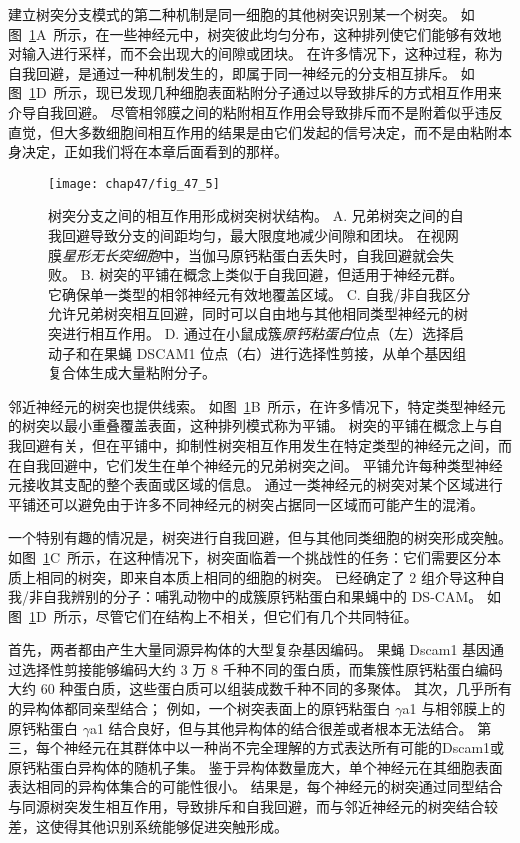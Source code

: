 建立树突分支模式的第二种机制是同一细胞的其他树突识别某一个树突。
如图~\ref{fig:47_5}A~所示，在一些神经元中，树突彼此均匀分布，这种排列使它们能够有效地对输入进行采样，而不会出现大的间隙或团块。
在许多情况下，这种过程，称为自我回避，是通过一种机制发生的，即属于同一神经元的分支相互排斥。
如图~\ref{fig:47_5}D~所示，现已发现几种细胞表面粘附分子通过以导致排斥的方式相互作用来介导自我回避。
尽管相邻膜之间的粘附相互作用会导致排斥而不是附着似乎违反直觉，但大多数细胞间相互作用的结果是由它们发起的信号决定，而不是由粘附本身决定，正如我们将在本章后面看到的那样。


\begin{figure}[htbp]
	\centering
	\texttt{[image: chap47/fig\_47\_5]}
	\caption{树突分支之间的相互作用形成树突树状结构。
		A. 兄弟树突之间的自我回避导致分支的间距均匀，最大限度地减少间隙和团块。
		在视网膜\textit{星形无长突细胞}中，当伽马原钙粘蛋白丢失时，自我回避就会失败。
		B. 树突的平铺在概念上类似于自我回避，但适用于神经元群。
		它确保单一类型的相邻神经元有效地覆盖区域。
		C. 自我/非自我区分允许兄弟树突相互回避，同时可以自由地与其他相同类型神经元的树突进行相互作用。
		D. 通过在小鼠成簇\textit{原钙粘蛋白}位点（左）选择启动子和在果蝇 DSCAM1 位点（右）进行选择性剪接，从单个基因组复合体生成大量粘附分子。}
	\label{fig:47_5}
\end{figure}


邻近神经元的树突也提供线索。
如图~\ref{fig:47_5}B~所示，在许多情况下，特定类型神经元的树突以最小重叠覆盖表面，这种排列模式称为平铺。
树突的平铺在概念上与自我回避有关，但在平铺中，抑制性树突相互作用发生在特定类型的神经元之间，而在自我回避中，它们发生在单个神经元的兄弟树突之间。
平铺允许每种类型神经元接收其支配的整个表面或区域的信息。
通过一类神经元的树突对某个区域进行平铺还可以避免由于许多不同神经元的树突占据同一区域而可能产生的混淆。


一个特别有趣的情况是，树突进行自我回避，但与其他同类细胞的树突形成突触。
如图~\ref{fig:47_5}C~所示，在这种情况下，树突面临着一个挑战性的任务：它们需要区分本质上相同的树突，即来自本质上相同的细胞的树突。
已经确定了 2 组介导这种自我/非自我辨别的分子：哺乳动物中的成簇原钙粘蛋白和果蝇中的 DS-CAM。
如图~\ref{fig:47_5}D~所示，尽管它们在结构上不相关，但它们有几个共同特征。


首先，两者都由产生大量同源异构体的大型复杂基因编码。
果蝇 Dscam1 基因通过选择性剪接能够编码大约 3 万 8 千种不同的蛋白质，而集簇性原钙粘蛋白编码大约 60 种蛋白质，这些蛋白质可以组装成数千种不同的多聚体。
其次，几乎所有的异构体都同亲型结合；
例如，一个树突表面上的原钙粘蛋白 $\gamma$a1 与相邻膜上的原钙粘蛋白 $\gamma$a1 结合良好，但与其他异构体的结合很差或者根本无法结合。
第三，每个神经元在其群体中以一种尚不完全理解的方式表达所有可能的Dscam1或原钙粘蛋白异构体的随机子集。
鉴于异构体数量庞大，单个神经元在其细胞表面表达相同的异构体集合的可能性很小。
结果是，每个神经元的树突通过同型结合与同源树突发生相互作用，导致排斥和自我回避，而与邻近神经元的树突结合较差，这使得其他识别系统能够促进突触形成。


